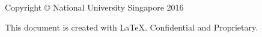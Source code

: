 \thispagestyle{empty}
{\small
\strut\vfill %
\noindent Copyright \copyright{} National University Singapore 2016\par
\vspace{0.2cm}
\noindent This document is created with LaTeX. Confidential and Proprietary. 
}
\clearpage
